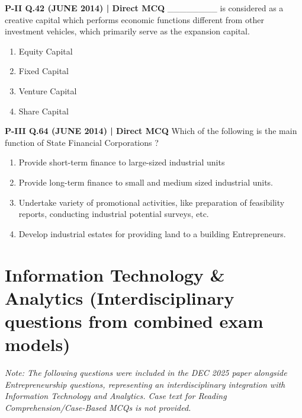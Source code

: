 \documentclass{article}
\begin{document}
\textbf{P-II Q.42 (JUNE 2014) | Direct MCQ}
________ is considered as a creative capital which performs economic functions different from other investment vehicles, which primarily serve as the expansion capital.
\begin{enumerate}[label=(\arabic*)]
    \item Equity Capital
    \item Fixed Capital
    \item Venture Capital
    \item Share Capital
\end{enumerate}

\textbf{P-III Q.64 (JUNE 2014) | Direct MCQ}
Which of the following is the main function of State Financial Corporations ?
\begin{enumerate}[label=(\arabic*)]
    \item Provide short-term finance to large-sized industrial units
    \item Provide long-term finance to small and medium sized industrial units.
    \item Undertake variety of promotional activities, like preparation of feasibility reports, conducting industrial potential surveys, etc.
    \item Develop industrial estates for providing land to a building Entrepreneurs.
\end{enumerate}

\section{Information Technology \& Analytics (Interdisciplinary questions from combined exam models)}

\emph{Note: The following questions were included in the DEC 2025 paper alongside Entrepreneurship questions, representing an interdisciplinary integration with Information Technology and Analytics. Case text for Reading Comprehension/Case-Based MCQs is not provided.}
\end{document}
